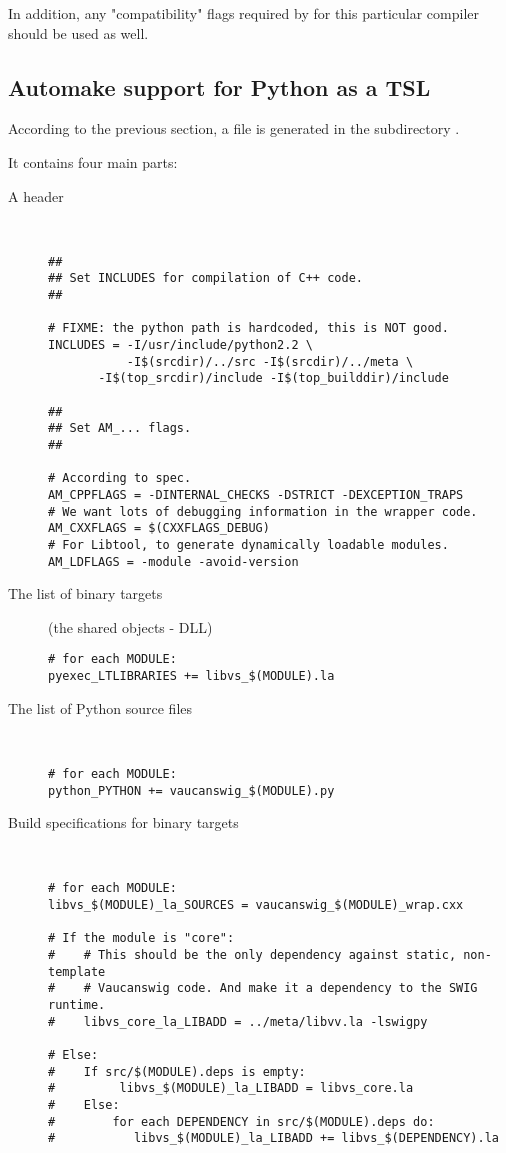 In addition, any "compatibility" flags required by \Vauc for this
particular \Cxx compiler should be used as well.


\subsection{Automake support for Python as a TSL}

According to the previous section, a  file is
generated in the subdirectory .

It contains four main parts:
\begin{description}
\item[A header]~\\
\begin{lstlisting}[language=Make]
##
## Set INCLUDES for compilation of C++ code.
##

# FIXME: the python path is hardcoded, this is NOT good.
INCLUDES = -I/usr/include/python2.2 \
           -I$(srcdir)/../src -I$(srcdir)/../meta \
  	   -I$(top_srcdir)/include -I$(top_builddir)/include

##
## Set AM_... flags.
##

# According to spec.
AM_CPPFLAGS = -DINTERNAL_CHECKS -DSTRICT -DEXCEPTION_TRAPS
# We want lots of debugging information in the wrapper code.
AM_CXXFLAGS = $(CXXFLAGS_DEBUG)
# For Libtool, to generate dynamically loadable modules.
AM_LDFLAGS = -module -avoid-version
\end{lstlisting}%

\item[The list of binary targets]
(the shared objects - DLL)

\begin{lstlisting}[language=Make]
# for each MODULE:
pyexec_LTLIBRARIES += libvs_$(MODULE).la
\end{lstlisting}%

\item[The list of Python source files]~\\

\begin{lstlisting}[language=Make]
# for each MODULE:
python_PYTHON += vaucanswig_$(MODULE).py
\end{lstlisting}%

\item[Build specifications for binary targets]~\\

\begin{lstlisting}[language=Make]
# for each MODULE:
libvs_$(MODULE)_la_SOURCES = vaucanswig_$(MODULE)_wrap.cxx

# If the module is "core":
#    # This should be the only dependency against static, non-template
#    # Vaucanswig code. And make it a dependency to the SWIG runtime.
#    libvs_core_la_LIBADD = ../meta/libvv.la -lswigpy

# Else:
#    If src/$(MODULE).deps is empty:
#	      libvs_$(MODULE)_la_LIBADD = libvs_core.la
#    Else:
#        for each DEPENDENCY in src/$(MODULE).deps do:
#	        libvs_$(MODULE)_la_LIBADD += libvs_$(DEPENDENCY).la
\end{lstlisting}%
\end{description}

